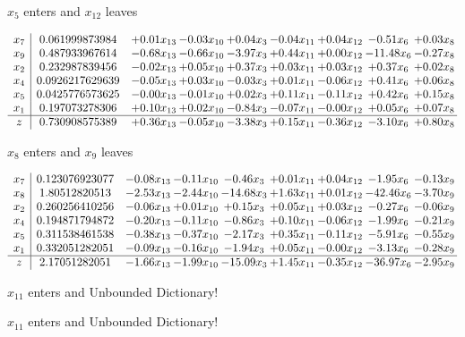 \documentclass[9pt]{article}
\begin{document}
 $ x_{5} $ enters and $ x_{12} $ leaves 

 \[\begin{array}{c| c c@{\hskip 2pt} c@{\hskip 2pt} c@{\hskip 2pt} c@{\hskip 2pt} c@{\hskip 2pt} c@{\hskip 2pt} c@{\hskip 2pt} }
 x_{7}   &  0.061999873984 & +  0.01 x_{13} & -0.03 x_{10} & +  0.04 x_{3} & -0.04 x_{11} & +  0.04 x_{12} & -0.51 x_{6} & +  0.03 x_{8}\\
 x_{9}   &  0.487933967614 & -0.68 x_{13} & -0.66 x_{10} & -3.97 x_{3} & +  0.44 x_{11} & +  0.00 x_{12} & -11.48 x_{6} & -0.27 x_{8}\\
 x_{2}   &  0.232987839456 & -0.02 x_{13} & +  0.05 x_{10} & +  0.37 x_{3} & +  0.03 x_{11} & +  0.03 x_{12} & +  0.37 x_{6} & +  0.02 x_{8}\\
 x_{4}   &  0.0926217629639 & -0.05 x_{13} & +  0.03 x_{10} & -0.03 x_{3} & +  0.01 x_{11} & -0.06 x_{12} & +  0.41 x_{6} & +  0.06 x_{8}\\
 x_{5}   &  0.0425776573625 & -0.00 x_{13} & -0.01 x_{10} & +  0.02 x_{3} & +  0.11 x_{11} & -0.11 x_{12} & +  0.42 x_{6} & +  0.15 x_{8}\\
 x_{1}   &  0.197073278306 & +  0.10 x_{13} & +  0.02 x_{10} & -0.84 x_{3} & -0.07 x_{11} & -0.00 x_{12} & +  0.05 x_{6} & +  0.07 x_{8}\\
\hline
z    &  0.730908575389 & +  0.36 x_{13} & -0.05 x_{10} & -3.38 x_{3} & +  0.15 x_{11} & -0.36 x_{12} & -3.10 x_{6} & +  0.80 x_{8}\\
\end{array}\]


 $ x_{8} $ enters and $ x_{9} $ leaves 

 \[\begin{array}{c| c c@{\hskip 2pt} c@{\hskip 2pt} c@{\hskip 2pt} c@{\hskip 2pt} c@{\hskip 2pt} c@{\hskip 2pt} c@{\hskip 2pt} }
 x_{7}   &  0.123076923077 & -0.08 x_{13} & -0.11 x_{10} & -0.46 x_{3} & +  0.01 x_{11} & +  0.04 x_{12} & -1.95 x_{6} & -0.13 x_{9}\\
 x_{8}   &  1.80512820513 & -2.53 x_{13} & -2.44 x_{10} & -14.68 x_{3} & +  1.63 x_{11} & +  0.01 x_{12} & -42.46 x_{6} & -3.70 x_{9}\\
 x_{2}   &  0.260256410256 & -0.06 x_{13} & +  0.01 x_{10} & +  0.15 x_{3} & +  0.05 x_{11} & +  0.03 x_{12} & -0.27 x_{6} & -0.06 x_{9}\\
 x_{4}   &  0.194871794872 & -0.20 x_{13} & -0.11 x_{10} & -0.86 x_{3} & +  0.10 x_{11} & -0.06 x_{12} & -1.99 x_{6} & -0.21 x_{9}\\
 x_{5}   &  0.311538461538 & -0.38 x_{13} & -0.37 x_{10} & -2.17 x_{3} & +  0.35 x_{11} & -0.11 x_{12} & -5.91 x_{6} & -0.55 x_{9}\\
 x_{1}   &  0.332051282051 & -0.09 x_{13} & -0.16 x_{10} & -1.94 x_{3} & +  0.05 x_{11} & -0.00 x_{12} & -3.13 x_{6} & -0.28 x_{9}\\
\hline
z    &  2.17051282051 & -1.66 x_{13} & -1.99 x_{10} & -15.09 x_{3} & +  1.45 x_{11} & -0.35 x_{12} & -36.97 x_{6} & -2.95 x_{9}\\
\end{array}\]


 $ x_{11} $ enters and Unbounded Dictionary!


 $ x_{11} $ enters and Unbounded Dictionary!
\end{document}
